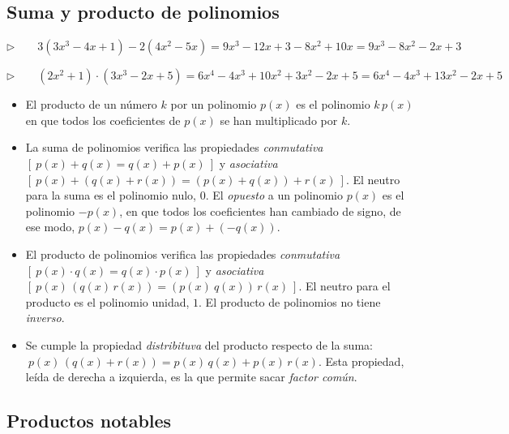 \subsection{Suma y producto de polinomios}
\vspace{0.5cm}

$\triangleright \qquad 3(3x^3-4x+1)-2(4x^2-5x)=9x^3-12x+3-8x^2+10x=9x^3-8x^2-2x+3$

$\triangleright \qquad (2x^2+1)\cdot (3x^3-2x+5)=6x^4-4x^3+10x^2+3x^2-2x+5=6x^4-4x^3+13x^2-2x+5$

\begin{itemize}
\item El producto de un número $k$ por un polinomio $p(x)$ es el polinomio $k\, p(x)$ en que todos los coeficientes de $p(x)$ se han multiplicado por $k$.
\item La suma de polinomios verifica las propiedades \emph{conmutativa} \textcolor{gris}{$[ \ p(x)+q(x)=q(x)+p(x) \ ]$} y \emph{asociativa} \textcolor{gris}{$[ \ p(x)+(q(x)+r(x))=(p(x)+q(x))+r(x) \ ]$}. El neutro para la suma es el polinomio nulo, $0$. El \emph{opuesto} a un polinomio $p(x)$ es el polinomio $-p(x)$, en que todos los coeficientes han cambiado de signo, de ese modo, $p(x)-q(x)=p(x)+(-q(x))$.
\item El producto de polinomios verifica las propiedades \emph{conmutativa} \textcolor{gris}{$[ \ p(x)\cdot q(x)=q(x) \cdot p(x) \ ]$} y \emph{asociativa} \textcolor{gris}{$[ \ p(x)\,(q(x)\, r(x))=(p(x)\ q(x))\, r(x) \ ]$}. El neutro para el producto es el polinomio unidad, $1$. El producto de polinomios no tiene \emph{inverso}.
\item Se cumple la propiedad \emph{distribituva} del producto respecto de la suma: $\ p(x)\, (q(x)+r(x))=p(x)\, q(x)+p(x)\, r(x)$. Esta  propiedad, leída de derecha a izquierda, es la que permite sacar \emph{factor común}.
\end{itemize}



\subsection{Productos notables}
\vspace{0.5cm}

